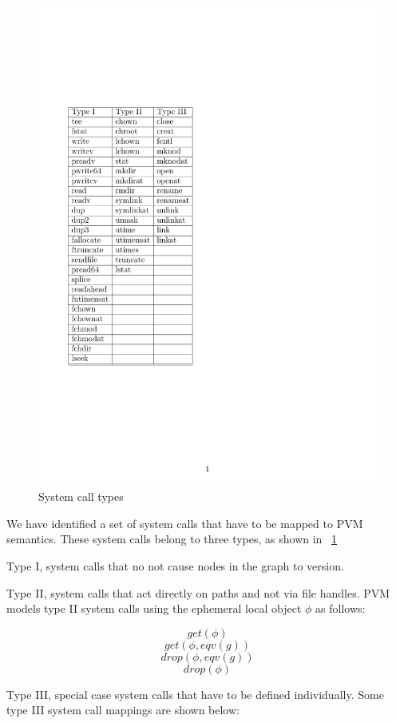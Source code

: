 \documentclass[withindex,glossary]{cam-thesis}
\begin{document}
\begin{figure}[t!]
  \centering
    \includegraphics[width=1.0\columnwidth]{SysCalls}
  \caption{System call types}
  \label{fig:syscalltypes}
\end{figure}

We have identified a set of system calls that have to be mapped to PVM semantics.
These system calls belong to three types, as shown in ~\ref{fig:syscalltypes}

Type I, system calls that no not cause nodes in the graph to version.

Type II, system calls that act directly on paths and not via file handles.
PVM models type II system calls using the ephemeral local object $\phi$ as follows:

$$get(\phi)$$
$$get(\phi, eqv(g))$$
$$drop(\phi, eqv(g))$$
$$drop(\phi)$$

Type III, special case system calls that have to be defined individually.
Some type III system call mappings are shown below:
\end{document}
